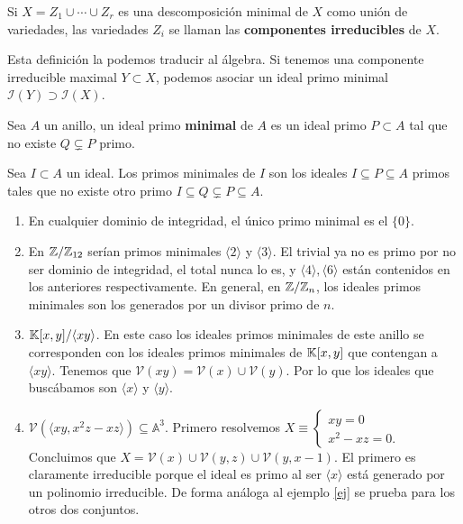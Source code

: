 \documentclass[ACGA.tex]{subfiles}
\begin{document}
\begin{defi}
 Si $X=Z_1\cup\cdots\cup Z_r$ es una descomposición minimal de $X$ como unión de variedades, las variedades $Z_i$ se llaman las {\bf componentes irreducibles} de $X$.
\end{defi}

Esta definición la podemos traducir al álgebra. Si tenemos una componente irreducible maximal $Y\subset X$, podemos asociar un ideal primo minimal $\mathcal{I}(Y)\supset\mathcal{I}(X)$.
\begin{defi}
Sea $A$ un anillo, un ideal primo \textbf{minimal} de $A$ es un ideal primo $P\subset A$ tal que no existe $Q\subsetneq P$ primo.
\end{defi}
\begin{defi}
Sea $I\subset A$ un ideal. Los primos minimales de $I$ son los ideales $I\subseteq P\subseteq A$ primos tales que no existe otro primo $I\subseteq Q\subsetneq P\subseteq A$.
\end{defi}

\begin{ej}
\begin{enumerate}
\item En cualquier dominio de integridad, el único primo minimal es el $\{0\}$. 
\item En $\mathbb{Z}/\mathbb{Z}_{12}$ serían primos minimales $\langle 2\rangle$ y $\langle 3\rangle$. El trivial ya no es primo por no ser dominio de integridad, el total nunca lo es, y $\langle 4\rangle,\langle 6\rangle$ están contenidos en los anteriores respectivamente. En general, en $\mathbb{Z}/\mathbb{Z}_{n}$, los ideales primos minimales son los generados por un divisor primo de $n$. 
\item $\mathbb{K}[x,y]/\langle xy\rangle$. En este caso los ideales primos minimales de este anillo se corresponden con los ideales primos minimales de $\mathbb{K}[x,y]$ que contengan a $\langle xy\rangle$. Tenemos que $\mathcal{V}(xy)=\mathcal{V}(x)\cup\mathcal{V}(y)$. Por lo que los ideales que buscábamos son $\langle x\rangle$ y $\langle y\rangle$.
\item $\mathcal{V}(\langle xy,x^2z-xz\rangle)\subseteq\mathbb{A}^3$. Primero resolvemos $X\equiv\begin{cases}
xy=0\\
x^2-xz=0.
\end{cases}$ Concluimos que $X=\mathcal{V}(x)\cup\mathcal{V}(y,z)\cup\mathcal{V}(y,x-1)$. El primero es claramente irreducible porque el ideal es primo al ser $\langle x\rangle$ está generado por un polinomio irreducible. De forma análoga al ejemplo \ref{ej} se prueba para los otros dos conjuntos. 
\end{enumerate}
\end{ej}
\end{document}
